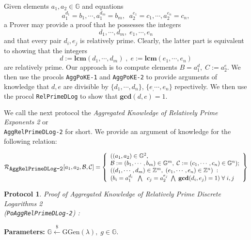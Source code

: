 \documentclass[11pt, lettersize, notitlepage, leqno, footskip=0.6cm]{article}
\newcommand{\bz}{\mathbb Z}
\newcommand{\mc}{\mathcal}
\newcommand{\mb}{\mathbb}
\newcommand{\mbf}{\mathbf}
\newcommand{\mr}{\mathrm}
\newcommand{\lamb}{\lambda}
\newcommand{\noin}{\noindent}
\newcommand{\LCM}{\mbf{lcm}}
\newcommand{\GCD}{\mbf{gcd}}
\newtheorem{Prot}[Thm]{Protocol}
\numberwithin{equation}{section}
\begin{document}
\bigskip

\noin Given elements $a_1, a_2\in \mb{G}$ and equations \vspace{-0.15cm}$$a_1^{d_1} = b_1,\cdots, a_1^{d_m}= b_m,\;\; a_2^{e_1} = c_1,\cdots, a_2^{e_n} = c_n,$$ a Prover may provide a proof that he possesses the integers \vspace{-0.15cm}$$d_1,\cdots, d_m,\;e_1,\cdots, e_n$$ and that every pair $d_i, e_j$ is relatively prime. Clearly, the latter part is equivalent to showing that the integers \vspace{-0.15cm}$$d:=\LCM(d_1,\cdots, d_m)\;,\;e:=\LCM(e_1,\cdots, e_n)$$ are relatively prime. Our approach is to compute elements $B = a_1^d,\;C:= a_2^{e}$. We then use the procols \verb|AggPoKE-1| and \verb|AggPoKE-2| to provide arguments of knowledge that $d, e$ are divisible by $\{d_1,\cdots, d_n \}$, $\{e_,\cdots,e_n \}$ repectively. We then  use the procol \verb|RelPrimeDLog| to show that $\GCD(d, e) = 1$.


We call the next protocol the \textit{Aggregated Knowledge of Relatively Prime Exponents 2} or\\ \verb|AggRelPrimeDLog-2| for short. We provide an argument of knowledge for the following relation:\vspace{-0.2cm}

\[
  \mc{R}_{{\protect\verb|AggRelPrimeDLog-2|}}[a_1, a_2, \mc{B}, \mc{C}] = \left\{\begin{array}{l}
    ((a_1,a_2)\in\mb{G}^2,\;\\
     \mc{B}:=(b_1,\cdots, b_m)\in\mb{G}^m,\;\mc{C}:= (c_1,\cdots, c_n)\in\mb{G}^n);\\
    ((d_1,\cdots,d_m)\in\bz^m,\; (e_1,\cdots,e_n)\in\bz^n)\;: \\
    (b_i = a_1^{d_i}\;\;\bigwedge\;\; c_j = a_2^{e_j}\;\bigwedge\; \GCD(d_i, e_j) = 1)\;\forall \;i,j   	
  \end{array}\right\}
\] 

\vspace{0.2cm}

\begin{Prot} \normalfont \textit{Proof of Aggregated Knowledge of Relatively Prime Discrete Logarithms 2}\\ (\verb|PoAggRelPrimeDLog-2|) :\end{Prot}\vspace{-0.3cm}

\noindent \textbf{Parameters:} $\mb{G}\xleftarrow{\$} \mr{GGen}(\lamb), \; g\in \mb{G}$.
\end{document}
